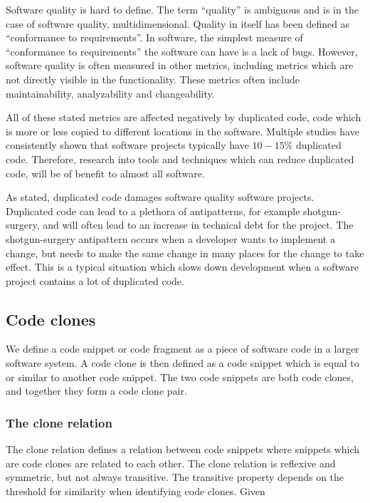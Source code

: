 \documentclass[12pt]{article}
\begin{document}
Software quality is hard to define. The term ``quality'' is ambiguous and is in the case
of software quality, multidimensional. Quality in itself has been defined as ``conformance
to requirements''\cite[8]{crosby1980quality}. In software, the simplest measure of
``conformance to requirements'' the software can have is a lack of bugs. However, software
quality is often measured in other metrics, including metrics which are not directly
visible in the functionality\cite[29]{MetricsAndModelsInSoftwareQuality}. These metrics
often include maintainability, analyzability and changeability.

All of these stated metrics are affected negatively by duplicated code, code which is more
or less copied to different locations in the software. Multiple studies have consistently
shown that software projects typically have $10-15\%$ duplicated
code\cite{CloningByAccident}. Therefore, research into tools and techniques which can
reduce duplicated code, will be of benefit to almost all software.

As stated, duplicated code damages software quality software projects. Duplicated code can
lead to a plethora of antipatterns, for example shotgun-surgery, and will often lead to an
increase in technical debt for the project\cite[99]{fowlerrefactoring}. The
shotgun-surgery antipattern occurs when a developer wants to implement a change, but needs
to make the same change in many places for the change to take effect. This is a typical
situation which slows down development when a software project contains a lot of
duplicated code. 

\subsection{Code clones}

We define a code snippet or code fragment as a piece of software code in a larger software
system. A code clone is then defined as a code snippet which is equal to or similar to
another code snippet. The two code snippets are both code clones, and together they form a
code clone pair.

\subsubsection{The clone relation}
The clone relation defines a relation between code snippets where snippets which are
code clones are related to each other. The clone relation is reflexive and symmetric, but
not always transitive. The transitive property depends on the threshold for similarity when
identifying code clones. Given
\end{document}
